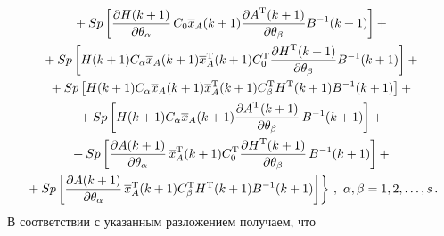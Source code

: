 \noindent
\begin{multline*}
{}+ Sp\left[\displaystyle\frac{\displaystyle \partial
H(k+1)\mathstrut}{\displaystyle \partial\theta_\alpha\mathstrut}\,C_0\overline{x}_A(k+1)\displaystyle\frac{\displaystyle \partial
A^{\mathrm{T}}(k+1)\mathstrut}{\displaystyle \partial\theta_\beta\mathstrut} B^{-1}(k+1)\right]+{}\\
{}+
Sp\left[H(k+1)C_\alpha\overline{x}_A(k+1)\overline{x}_A^{\mathrm{T}}(k+1)C_0^{\mathrm{T}}\displaystyle\frac{\displaystyle \partial
H^{\mathrm{T}}(k+1)\mathstrut}{\displaystyle \partial\theta_\beta\mathstrut} B^{-1}(k+1)\right]+{}\\
{}+Sp\left[ H(k+1)C_\alpha\overline{x}_A(k+1)\overline{x}_A^{\mathrm{T}}(k+1) C_\beta^{\mathrm{T}}
H^{\mathrm{T}}(k+1) B^{-1}(k+1)\right]+{}\\
{}+Sp\left[ H(k+1)C_\alpha \overline{x}_A(k+1)\displaystyle\frac{\displaystyle \partial
A^{\mathrm{T}}(k+1)\mathstrut}{\displaystyle \partial\theta_\beta\mathstrut}\,B^{-1}(k+1)\right]+{}\\
{}+Sp\left[ \displaystyle\frac{\displaystyle \partial
A(k+1)\mathstrut}{\displaystyle \partial\theta_\alpha\mathstrut}\,\overline{x}_A^{\mathrm{T}}(k+1)C_0^{\mathrm{T}}\displaystyle\frac{\displaystyle \partial
H^{\mathrm{T}}(k+1)\mathstrut}{\displaystyle \partial \theta_\beta\mathstrut}\,B^{-1}(k+1)\right]+{}\\
\left.{}+ Sp\left[ \displaystyle\frac{\displaystyle \partial
A(k+1)\mathstrut}{\displaystyle \partial\theta_\alpha\mathstrut}\,\overline{x}_A^{\mathrm{T}}(k+1)C_\beta^{\mathrm{T}} H^{\mathrm{T}} (k+1) B^{-1}(k+1)
\right]\right\}\,,\ \alpha,\beta=1, 2, \ldots , s\,.
\end{multline*}
 В соответствии с указанным разложением получаем, что
